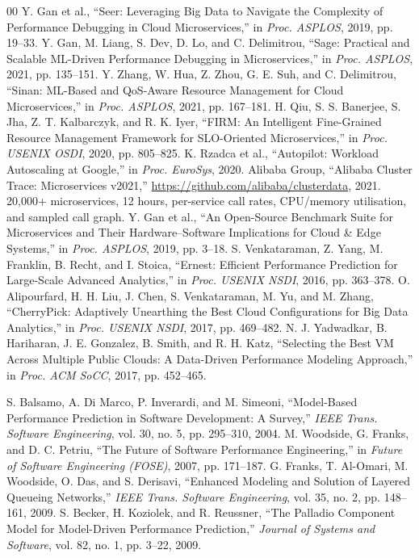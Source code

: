 \documentclass[journal, 10pt]{IEEEtran}
\begin{document}
\begin{thebibliography}{00}
Y. Gan et al., ``Seer: Leveraging Big Data to Navigate the Complexity of Performance Debugging in Cloud Microservices,'' in \emph{Proc. ASPLOS}, 2019, pp. 19--33.
Y. Gan, M. Liang, S. Dev, D. Lo, and C. Delimitrou, ``Sage: Practical and Scalable ML-Driven Performance Debugging in Microservices,'' in \emph{Proc. ASPLOS}, 2021, pp. 135--151.
Y. Zhang, W. Hua, Z. Zhou, G. E. Suh, and C. Delimitrou, ``Sinan: ML-Based and QoS-Aware Resource Management for Cloud Microservices,'' in \emph{Proc. ASPLOS}, 2021, pp. 167--181.
H. Qiu, S. S. Banerjee, S. Jha, Z. T. Kalbarczyk, and R. K. Iyer, ``FIRM: An Intelligent Fine-Grained Resource Management Framework for SLO-Oriented Microservices,'' in \emph{Proc. USENIX OSDI}, 2020, pp. 805--825.
K. Rzadca et al., ``Autopilot: Workload Autoscaling at Google,'' in \emph{Proc. EuroSys}, 2020.
Alibaba Group, ``Alibaba Cluster Trace: Microservices v2021,''
\url{https://github.com/alibaba/clusterdata}, 2021. 20{,}000+ microservices,
12 hours, per-service call rates, CPU/memory utilisation, and sampled call graph.
Y. Gan et al., ``An Open-Source Benchmark Suite for Microservices and Their Hardware--Software Implications for Cloud \& Edge Systems,'' in \emph{Proc. ASPLOS}, 2019, pp. 3--18.
S. Venkataraman, Z. Yang, M. Franklin, B. Recht, and I. Stoica, ``Ernest: Efficient Performance Prediction for Large-Scale Advanced Analytics,'' in \emph{Proc. USENIX NSDI}, 2016, pp. 363--378.
O. Alipourfard, H. H. Liu, J. Chen, S. Venkataraman, M. Yu, and M. Zhang, ``CherryPick: Adaptively Unearthing the Best Cloud Configurations for Big Data Analytics,'' in \emph{Proc. USENIX NSDI}, 2017, pp. 469--482.
N. J. Yadwadkar, B. Hariharan, J. E. Gonzalez, B. Smith, and R. H. Katz, ``Selecting the Best VM Across Multiple Public Clouds: A Data-Driven Performance Modeling Approach,'' in \emph{Proc. ACM SoCC}, 2017, pp. 452--465.

S. Balsamo, A. Di Marco, P. Inverardi, and M. Simeoni, ``Model-Based Performance Prediction in Software Development: A Survey,'' \emph{IEEE Trans. Software Engineering}, vol. 30, no. 5, pp. 295--310, 2004.
M. Woodside, G. Franks, and D. C. Petriu, ``The Future of Software Performance Engineering,'' in \emph{Future of Software Engineering (FOSE)}, 2007, pp. 171--187.
G. Franks, T. Al-Omari, M. Woodside, O. Das, and S. Derisavi, ``Enhanced Modeling and Solution of Layered Queueing Networks,'' \emph{IEEE Trans. Software Engineering}, vol. 35, no. 2, pp. 148--161, 2009.
S. Becker, H. Koziolek, and R. Reussner, ``The Palladio Component Model for Model-Driven Performance Prediction,'' \emph{Journal of Systems and Software}, vol. 82, no. 1, pp. 3--22, 2009.


\end{thebibliography}
\end{document}
